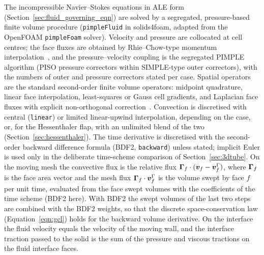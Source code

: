 The incompressible Navier--Stokes equations in ALE form (Section~\ref{sec:fluid_governing_eqn}) are solved by a segregated, pressure-based finite volume procedure (\texttt{pimpleFluid} in solids4foam, adapted from the OpenFOAM \texttt{pimpleFoam} solver).
Velocity and pressure are collocated at cell centres; the face fluxes are obtained by Rhie--Chow-type momentum interpolation~\citep{Rhie1983}, and the pressure--velocity coupling is the segregated PIMPLE algorithm (PISO pressure correctors within SIMPLE-type outer correctors), with the numbers of outer and pressure correctors stated per case.
Spatial operators are the standard second-order finite volume operators: midpoint quadrature, linear face interpolation, least-squares or Gauss cell gradients, and Laplacian face fluxes with explicit non-orthogonal correction~\citep{Jasak1996}.
Convection is discretised with central (\texttt{linear}) or limited linear-upwind interpolation, depending on the case, or, for the Hessenthaler flap, with an unlimited blend of the two (Section~\ref{sec:hessenthaler}).
The time derivative is discretised with the second-order backward difference formula (BDF2, \texttt{backward}) unless stated; implicit Euler is used only in the deliberate time-scheme comparison of Section~\ref{sec:3dtube}.
On the moving mesh the convective flux is the relative flux $\boldsymbol{\Gamma}_f\cdot(\boldsymbol{v}_f - \boldsymbol{v}^\Gamma_f)$, where $\boldsymbol{\Gamma}_f$ is the face area vector and the mesh flux $\boldsymbol{\Gamma}_f\cdot\boldsymbol{v}^\Gamma_f$ is the volume swept by face $f$ per unit time, evaluated from the face swept volumes with the coefficients of the time scheme (BDF2 here).
With BDF2 the swept volumes of the last two steps are combined with the BDF2 weights, so that the discrete space-conservation law (Equation~\eqref{eqn:gcl}) holds for the backward volume derivative.
On the interface the fluid velocity equals the velocity of the moving wall, and the interface traction passed to the solid is the sum of the pressure and viscous tractions on the fluid interface faces.


